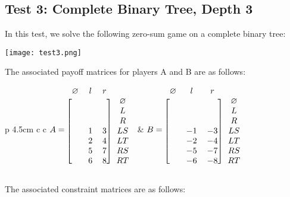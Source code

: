 \documentclass[11pt]{tufte-handout}
\theoremstyle{plain}
\theoremstyle{definition}
\theoremstyle{remark}
\begin{document}
\subsection{Test 3: Complete Binary Tree, Depth 3}
In this test, we solve the following zero-sum game on a complete binary tree:
\\[6pt]
\begin{center}
    \texttt{[image: test3.png]}
\end{center}
The associated payoff matrices for players A and B are as follows:\\[6pt]
\begin{tabular}{p {4.5cm} c c}
     {$\displaystyle
        A = \begin{blockarray}{c c c c}
            \varnothing & l & r\\
            \begin{block}{[c c c] c}
               &   &  & \varnothing \\
               &   &  & L \\
               &   &  & R \\
               & 1 & 3 & LS \\
               & 2 & 4 & LT \\
               & 5 & 7 & RS \\
               & 6 & 8 & RT \\
            \end{block}
            \end{blockarray}$} &
        {$B = \begin{blockarray}{c c c c}
                \varnothing & l & r\\
                \begin{block}{[c c c] c}
               &   &  & \varnothing \\
               &   &  & L \\
               &   &  & R \\
               & -1 & -3 & LS \\
               & -2 & -4 & LT \\
               & -5 & -7 & RS \\
               & -6 & -8 & RT \\
                \end{block}
                \end{blockarray}
    $}
\end{tabular}

The associated constraint matrices are as follows: \\[12pt]
\end{document}
